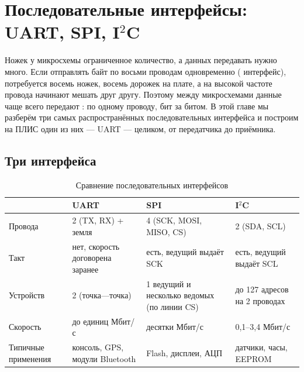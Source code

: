 \chapter{Последовательные интерфейсы: UART, SPI, I$^2$C}
\label{ch:uart}

Ножек у микросхемы ограниченное количество, а данных передавать нужно много. Если
отправлять байт по восьми проводам одновременно (
интерфейс), потребуется восемь ножек, восемь дорожек на плате, а на высокой
частоте провода начинают мешать друг другу. Поэтому между микросхемами данные
чаще всего передают : по одному проводу, бит за битом. В
этой главе мы разберём три самых распространённых последовательных
интерфейса и построим на ПЛИС один из них --- UART --- целиком, от передатчика
до приёмника.

\section{Три интерфейса}

\begin{table}[H]
\centering
\caption{Сравнение последовательных интерфейсов}
\small
\begin{tabularx}{\textwidth}{l X X X}
\toprule
 & \textbf{UART} & \textbf{SPI} & \textbf{I$^2$C} \\
\midrule
Провода & 2 (TX, RX) + земля & 4 (SCK, MOSI, MISO, CS) & 2 (SDA, SCL) \\
Такт & нет, скорость договорена заранее & есть, ведущий выдаёт SCK & есть, ведущий выдаёт SCL \\
Устройств & 2 (точка---точка) & 1 ведущий и несколько ведомых (по линии CS) & до 127 адресов на 2 проводах \\
Скорость & до единиц Мбит/с & десятки Мбит/с & 0,1--3,4 Мбит/с \\
Типичные применения & консоль, GPS, модули Bluetooth & Flash, дисплеи, АЦП & датчики, часы, EEPROM \\
\bottomrule
\end{tabularx}
\end{table}

